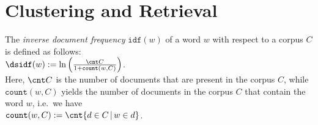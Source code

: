 \chapter{Clustering and Retrieval}


The \emph{inverse document frequency} $\mathtt{idf}(w)$ of a word $w$ with respect to a corpus $C$ is defined as
follows:
\\[0.2cm]
\hspace*{1.3cm}
$\ds\mathtt{idf}(w) := \ln\left(\frac{\cnt C}{1 + \mathtt{count}(w, C)}\right)$.
\\[0.2cm]
Here, $\cnt C$ is the number of documents that are present in the corpus $C$, while
$\mathtt{count}(w, C)$ yields the number of documents in the corpus $C$ that contain the word $w$,
i.e.~we have
\\[0.2cm]
\hspace*{1.3cm}
$\mathtt{count}(w, C) := \cnt\{ d \in C \,|\, w \in d \}$.
\\[0.2cm]

